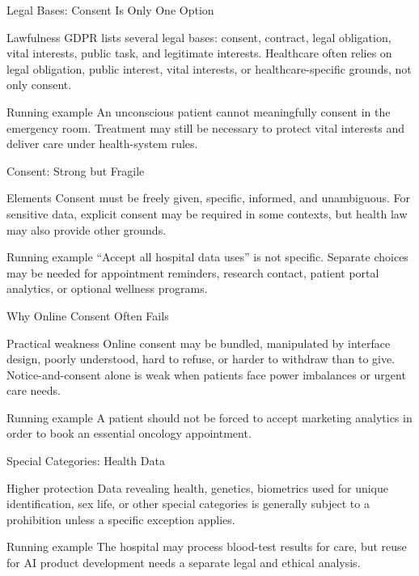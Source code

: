 \documentclass[presentation]{beamer}
\begin{document}
\begin{frame}[c]{Legal Bases: Consent Is Only One Option}
\begin{block}{Lawfulness}
GDPR lists several legal bases: consent, contract, legal obligation, vital interests, public task,
and legitimate interests. Healthcare often relies on legal obligation, public interest, vital
interests, or healthcare-specific grounds, not only consent.
\end{block}

\begin{exampleblock}{Running example}
An unconscious patient cannot meaningfully consent in the emergency room. Treatment may still be
necessary to protect vital interests and deliver care under health-system rules.
\end{exampleblock}
\end{frame}

\begin{frame}[c]{Consent: Strong but Fragile}
\begin{block}{Elements}
Consent must be freely given, specific, informed, and unambiguous. For sensitive data, explicit
consent may be required in some contexts, but health law may also provide other grounds.
\end{block}

\begin{exampleblock}{Running example}
``Accept all hospital data uses'' is not specific. Separate choices may be needed for appointment
reminders, research contact, patient portal analytics, or optional wellness programs.
\end{exampleblock}
\end{frame}

\begin{frame}[c]{Why Online Consent Often Fails}
\begin{block}{Practical weakness}
Online consent may be bundled, manipulated by interface design, poorly understood, hard to refuse,
or harder to withdraw than to give. Notice-and-consent alone is weak when patients face power
imbalances or urgent care needs.
\end{block}

\begin{exampleblock}{Running example}
A patient should not be forced to accept marketing analytics in order to book an essential oncology
appointment.
\end{exampleblock}
\end{frame}

\begin{frame}[c]{Special Categories: Health Data}
\begin{block}{Higher protection}
Data revealing health, genetics, biometrics used for unique identification, sex life, or other
special categories is generally subject to a prohibition unless a specific exception applies.
\end{block}

\begin{exampleblock}{Running example}
The hospital may process blood-test results for care, but reuse for AI product development needs a
separate legal and ethical analysis.
\end{exampleblock}
\end{frame}
\end{document}
